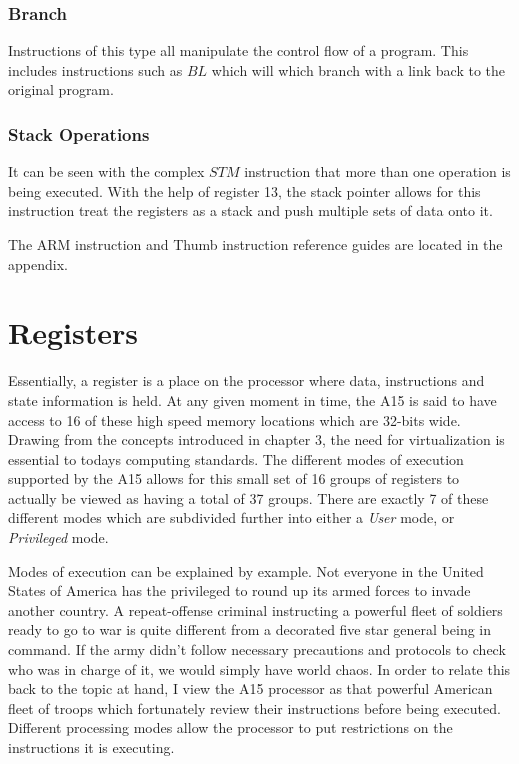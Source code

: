 \documentclass[12pt]{scrreprt}
\begin{document}
	\subsection{Branch}
		Instructions of this type all manipulate the control flow of a program.
		This includes instructions such as $BL$ which will which branch with a link back to the original program.
	\subsection{Stack Operations}
		It can be seen with the complex $STM$ instruction that more than one operation is being executed.
		With the help of register 13, the stack pointer allows for this instruction treat the registers as a stack and push multiple sets of data onto it.

	The ARM instruction and Thumb instruction reference guides are located in the appendix.

{\let\clearpage\relax\chapter{Registers}}

	Essentially, a register is a place on the processor where data, instructions and state information is held.
	At any given moment in time, the A15 is said to have access to 16 of these high speed memory locations which are 32-bits wide.
	Drawing from the concepts introduced in chapter 3, the need for virtualization is essential to todays computing standards.
	The different modes of execution supported by the A15 allows for this small set of 16 groups of registers to actually be viewed as having a total of 37 groups.
	There are exactly 7 of these different modes which are subdivided further into either a \textit{User} mode, or \textit{Privileged} mode.
	
	Modes of execution can be explained by example.
	Not everyone in the United States of America has the privileged to round up its armed forces to invade another country.
	A repeat-offense criminal instructing a powerful fleet of soldiers ready to go to war is quite different from a decorated five star general being in command.
	If the army didn't follow necessary precautions and protocols to check who was in charge of it, we would simply have world chaos.
	In order to relate this back to the topic at hand, I view the A15 processor as that powerful American fleet of troops which fortunately review their instructions before being executed.
	Different processing modes allow the processor to put restrictions on the instructions it is executing.
\end{document}
